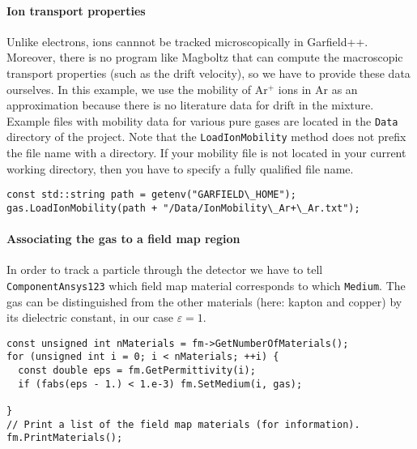 \paragraph{Ion transport properties}
Unlike electrons, ions cannnot be tracked microscopically in Garfield++.
Moreover, there is no program like Magboltz that can compute  
the macroscopic transport properties (such as the drift velocity),
so we have to provide these data ourselves.
In this example, we use the mobility of Ar$^{+}$ ions in Ar
as an approximation because there is no literature data for drift in the
mixture.
Example files with mobility data for various pure gases are located
in the \texttt{Data} directory of the project.
Note that the \texttt{LoadIonMobility} method does not prefix
the file name with a directory.
If your mobility file is not located in your current working directory,
then you have to specify a fully qualified file name.
\begin{lstlisting}
const std::string path = getenv("GARFIELD\_HOME");
gas.LoadIonMobility(path + "/Data/IonMobility\_Ar+\_Ar.txt");
\end{lstlisting}
\paragraph{Associating the gas to a field map region}
In order to track a particle through the detector we have to 
tell \texttt{ComponentAnsys123} which field map material corresponds 
to which \texttt{Medium}.
The gas can be distinguished from the other materials
(here: kapton and copper) by its dielectric constant, in our case
$\varepsilon = 1$.
\begin{lstlisting}
const unsigned int nMaterials = fm->GetNumberOfMaterials();
for (unsigned int i = 0; i < nMaterials; ++i) {
  const double eps = fm.GetPermittivity(i);
  if (fabs(eps - 1.) < 1.e-3) fm.SetMedium(i, gas);

}
// Print a list of the field map materials (for information).
fm.PrintMaterials();
\end{lstlisting}

